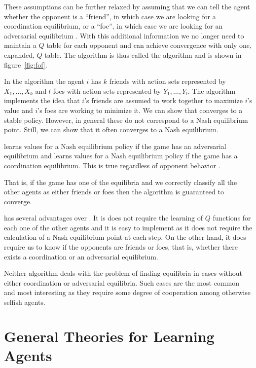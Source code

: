 These assumptions can be further relaxed by assuming that we can tell
the agent whether the opponent is a ``friend'', in which case we are
looking for a coordination equilibrium, or a ``foe'', in which case we
are looking for an adversarial equilibrium \cite{littman01a}. With
this additional information we no longer need to maintain a $Q$ table
for each opponent and can achieve convergence with only one, expanded,
$Q$ table. The algorithm is thus called the 
algorithm and is shown in figure~\ref{fig:fof}.

In the  algorithm the agent $i$ has $k$
friends with action sets represented by $X_1,\ldots,X_k$ and $l$ foes
with action sets represented by $Y_1,\ldots,Y_l$.  The algorithm
implements the idea that $i$'s friends are assumed to work together to
maximize $i$'s value and $i$'s foes are working to minimize it. We can
show that  converges to a stable policy. However,
in general these do not correspond to a Nash equilibrium point. Still,
we can show that it often converges to a Nash equilibrium.

\begin{theorem}
   learns values for a Nash equilibrium policy if the game
  has an adversarial equilibrium and  learns values for
  a Nash equilibrium policy if the game has a coordination
  equilibrium. This is true regardless of opponent behavior
  \cite{littman01a}.
\end{theorem}


That is, if the game has one of the equilibria and we correctly
classify all the other agents as either friends or foes then the
 algorithm is guaranteed to converge.

 has several advantages over
. It is does not require the learning of $Q$
functions for each one of the other agents and it is easy to implement
as it does not require the calculation of a Nash equilibrium point at
each step. On the other hand, it does require us to know if the
opponents are friends or foes, that is, whether there exists a
coordination or an adversarial equilibrium.

Neither algorithm deals with the problem of finding equilibria in
cases without either coordination or adversarial equilibria. Such
cases are the most common and most interesting as they require some
degree of cooperation among otherwise selfish agents.

\section{General Theories for Learning Agents}
\label{sec:learning-agents}

